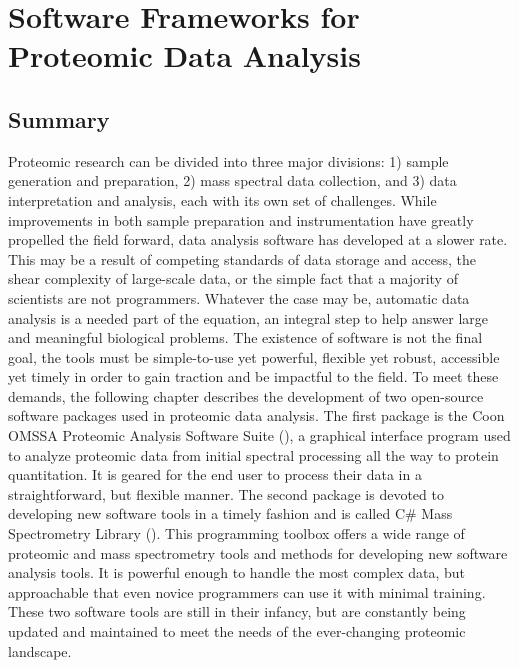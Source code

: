 \chapter{Software Frameworks for Proteomic Data Analysis}

\section{Summary}
Proteomic research can be divided into three major divisions: 1) sample generation and preparation, 2) mass spectral data collection, and 3) data interpretation and analysis, each with its own set of challenges. While improvements in both sample preparation and instrumentation have greatly propelled the field forward, data analysis software has developed at a slower rate. This may be a result of competing standards of data storage and access, the shear complexity of large-scale data, or the simple fact that a majority of scientists are not programmers. Whatever the case may be, automatic data analysis is a needed part of the equation, an integral step to help answer large and meaningful biological problems. The existence of software is not the final goal, the tools must be simple-to-use yet powerful, flexible yet robust, accessible yet timely in order to gain traction and be impactful to the field. To meet these demands, the following chapter describes the development of two open-source software packages used in proteomic data analysis. The first package is the Coon OMSSA Proteomic Analysis Software Suite (\compass{}), a graphical interface program used to analyze proteomic data from initial spectral processing all the way to protein quantitation. It is geared for the end user to process their data in a straightforward, but flexible manner. The second package is devoted to developing new software tools in a timely fashion and is called C\# Mass Spectrometry Library (\csmsl{}). This programming toolbox offers a wide range of proteomic and mass spectrometry tools and methods for developing new software analysis tools. It is powerful enough to handle the most complex data, but approachable that even novice programmers can use it with minimal training. These two software tools are still in their infancy, but are constantly being updated and maintained to meet the needs of the ever-changing proteomic landscape.

